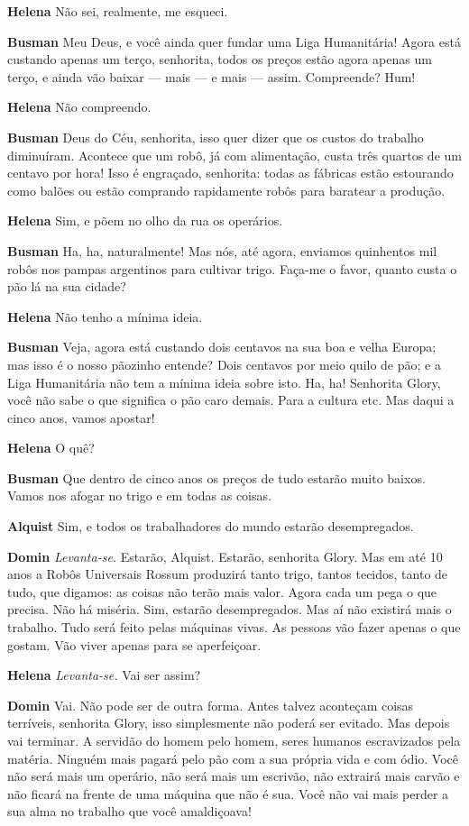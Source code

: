 \textbf{Helena} Não sei, realmente, me esqueci.

\textbf{Busman} Meu Deus, e você ainda quer fundar uma Liga Humanitária! Agora
está custando apenas um terço, senhorita, todos os preços estão agora apenas um
terço, e ainda vão baixar --- mais --- e mais --- assim. Compreende? Hum!

\textbf{Helena} Não compreendo.

\textbf{Busman} Deus do Céu, senhorita, isso quer dizer que os custos do trabalho diminuíram.
Acontece que um robô, já com alimentação, custa três quartos de um centavo por
hora! Isso é engraçado, senhorita: todas as fábricas estão estourando como
balões ou estão comprando rapidamente robôs para baratear a produção.

\textbf{Helena} Sim, e põem no olho da rua os operários.

\textbf{Busman} Ha, ha, naturalmente! Mas nós, até agora, enviamos quinhentos
mil robôs nos pampas argentinos para cultivar trigo. Faça-me o favor, quanto
custa o pão lá na sua cidade?

\textbf{Helena} Não tenho a mínima ideia.

\textbf{Busman} Veja, agora está custando dois centavos na sua boa e velha Europa; mas
isso é o nosso pãozinho entende? Dois centavos por meio quilo de pão; e a Liga
Humanitária não tem a mínima ideia sobre isto. Ha, ha! Senhorita Glory, você não
sabe o que significa o pão caro demais. Para a cultura etc. Mas daqui a cinco
anos, vamos apostar!

\textbf{Helena} O quê?

\textbf{Busman} Que dentro de cinco anos os preços de tudo estarão muito baixos. 
Vamos nos afogar no trigo e em todas as coisas.

\textbf{Alquist} Sim, e todos os trabalhadores do mundo estarão desempregados.

\textbf{Domin} \emph{Levanta-se.} Estarão, Alquist. Estarão, senhorita Glory. Mas em
até 10 anos a Robôs Universais Rossum produzirá tanto trigo, tantos tecidos,
tanto de tudo, que digamos: as coisas não terão mais valor. Agora cada um pega o
que precisa. Não há miséria. Sim, estarão desempregados. Mas aí não
existirá mais o trabalho. Tudo será feito pelas máquinas vivas. As pessoas vão fazer
apenas o que gostam. Vão viver apenas para se aperfeiçoar.

\textbf{Helena} \emph{Levanta-se.} Vai ser assim?

\textbf{Domin} Vai. Não pode ser de outra forma. Antes talvez aconteçam coisas
terríveis, senhorita Glory, isso simplesmente não poderá ser evitado. Mas depois
vai terminar. A servidão do homem pelo homem, seres humanos escravizados
pela matéria. Ninguém mais pagará pelo pão com a sua própria vida e com ódio.
Você não será mais um operário, não será mais um escrivão, não extrairá
mais carvão e não ficará na frente de uma máquina que não é sua. Você não vai mais
perder a sua alma no trabalho que você amaldiçoava!

